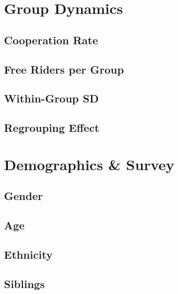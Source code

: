 \documentclass[11pt, landscape]{article}
\begin{document}
\newpage

\section{Group Dynamics}

\subsection{Cooperation Rate}


\subsection{Free Riders per Group}


\subsection{Within-Group SD}


\subsection{Regrouping Effect}


\newpage

\section{Demographics \& Survey}

\subsection{Gender}


\subsection{Age}


\subsection{Ethnicity}


\subsection{Siblings}

\end{document}
